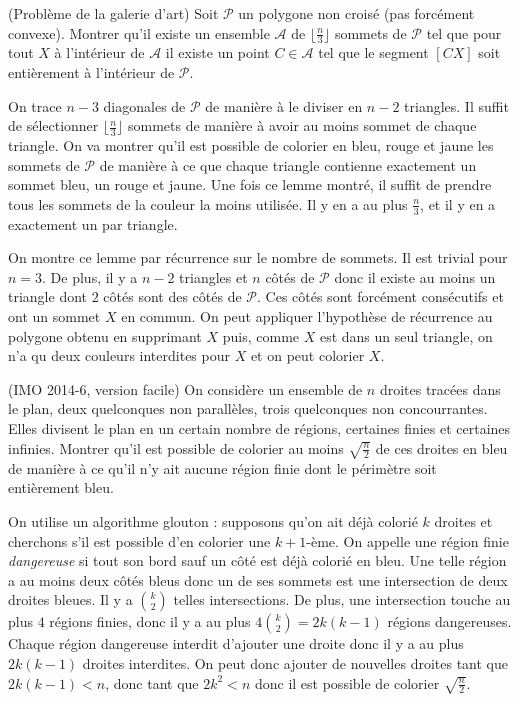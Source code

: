 \begin{exo}(Problème de la galerie d'art)
Soit $\mathcal{P}$ un polygone non croisé (pas forcément convexe). Montrer qu'il existe un ensemble $\mathcal{A}$ de $\lfloor \frac{n}{3} \rfloor$ sommets de $\mathcal{P}$ tel que pour tout $X$ à l'intérieur de $\mathcal{A}$ il existe un point $C \in \mathcal{A}$ tel que le segment $[CX]$ soit entièrement à l'intérieur de $\mathcal{P}$.
\end{exo}

\begin{sol}
On trace $n-3$ diagonales de $\mathcal{P}$ de manière à le diviser en $n-2$ triangles. Il suffit de sélectionner $\lfloor \frac{n}{3} \rfloor$ sommets de manière à avoir au moins sommet de chaque triangle. On va montrer qu'il est possible de colorier en bleu, rouge et jaune les sommets de $\mathcal{P}$ de manière à ce que chaque triangle contienne exactement un sommet bleu, un rouge et jaune. Une fois ce lemme montré, il suffit de prendre tous les sommets de la couleur la moins utilisée. Il y en a au plus $\frac{n}{3}$, et il y en a exactement un par triangle.

On montre ce lemme par récurrence sur le nombre de sommets. Il est trivial pour $n=3$. De plus, il y a $n-2$ triangles et $n$ côtés de $\mathcal{P}$ donc il existe au moins un triangle dont $2$ côtés sont des côtés de $\mathcal{P}$. Ces côtés sont forcément consécutifs et ont un sommet $X$ en commun. On peut appliquer l'hypothèse de récurrence au polygone obtenu en supprimant $X$ puis, comme $X$ est dans un seul triangle, on n'a qu deux couleurs interdites pour $X$ et on peut colorier $X$.
\end{sol}

\begin{exo} (IMO 2014-6, version facile)
On considère un ensemble de $n$ droites tracées dans le plan, deux quelconques non parallèles, trois quelconques non concourrantes. Elles divisent le plan en un certain nombre de régions, certaines finies et certaines infinies. Montrer qu'il est possible de colorier au moins $\sqrt{\frac{n}{2}}$ de ces droites en bleu de manière à ce qu'il n'y ait aucune région finie dont le périmètre soit entièrement bleu.
\end{exo}

\begin{sol}
On utilise un algorithme glouton : supposons qu'on ait déjà colorié $k$ droites et cherchons s'il est possible d'en colorier une $k+1$-ème. On appelle une région finie \textit{dangereuse} si tout son bord sauf un côté est déjà colorié en bleu. Une telle région a au moins deux côtés bleus donc un de ses sommets est une intersection de deux droites bleues. Il y a $\binom{k}{2}$ telles intersections. De plus, une intersection touche au plus $4$ régions finies, donc il y a au plus $4 \binom{k}{2}=2k(k-1)$ régions dangereuses. Chaque région dangereuse interdit d'ajouter une droite donc il y a au plus $2k(k-1)$ droites interdites. On peut donc ajouter de nouvelles droites tant que $2k(k-1)<n$, donc tant que $2k^2<n$ donc il est possible de colorier $\sqrt{\frac{n}{2}}$.
\end{sol}


